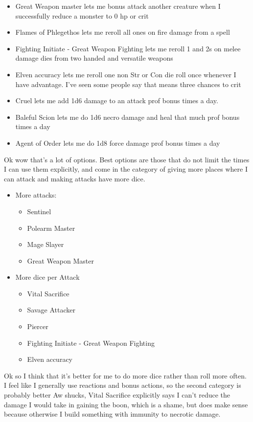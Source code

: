 \documentclass[12pt]{article}[titlepage]
\renewcommand{\,}{\textsuperscript{,}}
\begin{document}
\begin{itemize}
\item Great Weapon master lets me bonus attack another creature when I successfully reduce a monster to 0 hp or crit
\item Flames of Phlegethos lets me reroll all ones on fire damage from a spell
\item Fighting Initiate - Great Weapon Fighting lets me reroll 1 and 2s on melee damage dies from two handed and versatile weapons
\item Elven accuracy lets me reroll one non Str or Con die roll once whenever I have advantage. I've seen some people say that means three chances to crit
\item Cruel lets me add 1d6 damage to an attack prof bonus times a day.
\item Baleful Scion lets me do 1d6 necro damage and heal that much prof bonus times a day
\item Agent of Order lets me do 1d8 force damage prof bonus times a day
\end{itemize}

Ok wow that's a lot of options.
Best options are those that do not limit the times I can use them explicitly, and come in the category of giving more places where I can attack and making attacks have more dice.
\begin{itemize}
\item More attacks:
\begin{itemize}
\item Sentinel
\item Polearm Master
\item Mage Slayer
\item Great Weapon Master 
\end{itemize}
\item More dice per Attack
\begin{itemize}
\item Vital Sacrifice
\item Savage Attacker
\item Piercer
\item Fighting Initiate - Great Weapon Fighting
\item Elven accuracy
\end{itemize}
\end{itemize}
Ok so I think that it's better for me to do more dice rather than roll more often.
I feel like I generally use reactions and bonus actions, so the second category is probably better
Aw shucks, Vital Sacrifice explicitly says I can't reduce the damage I would take in gaining the boon, which is a shame, but does make sense because otherwise I build something with immunity to necrotic damage.
\end{document}
